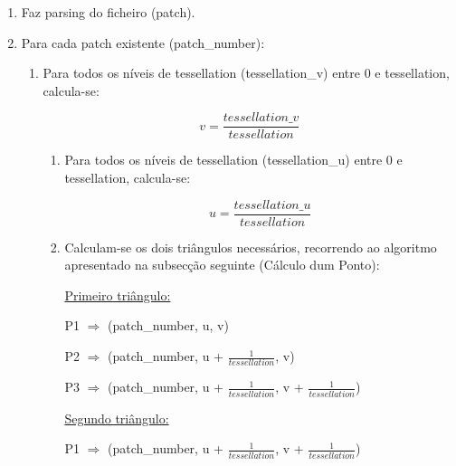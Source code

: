\documentclass[a4paper]{article}
\begin{document}
\ttfamily
\begin{enumerate}
  \item Faz parsing do ficheiro (patch).
  \item Para cada patch existente (patch\_number):
  \begin{enumerate}
  	\item Para todos os níveis de tessellation (tessellation\_v) entre 0 e tessellation, calcula-se:
	\vspace{0.5cm}

	\hspace{0.0cm} $$v = \frac{tessellation\_v}{tessellation}$$

	\vspace{0.5cm}

	\begin{enumerate}
		\item Para todos os níveis de tessellation (tessellation\_u) entre 0 e tessellation, calcula-se:
		\vspace{0.5cm}

		\hspace{0.0cm} $$u = \frac{tessellation\_u}{tessellation}$$

		\vspace{0.5cm}
		\item Calculam-se os dois triângulos necessários, recorrendo ao algoritmo apresentado na subsecção seguinte (Cálculo dum Ponto):
		\vspace{0.3cm}

      		\underline{Primeiro triângulo:}

     		\vspace{0.3cm}

          	P1 $\Rightarrow$ (patch\_number, u, v)

      		\vspace{0.2cm}

          	P2 $\Rightarrow$ (patch\_number, u + $\frac{1}{tessellation}$, v)

      		\vspace{0.2cm}

         	P3 $\Rightarrow$ (patch\_number, u + $\frac{1}{tessellation}$, v + $\frac{1}{tessellation}$)

      		\vspace{0.3cm}

		\underline{Segundo triângulo:}

      		\vspace{0.3cm}

          	P1 $\Rightarrow$ (patch\_number, u + $\frac{1}{tessellation}$, v + $\frac{1}{tessellation}$)


\end{enumerate}
\end{enumerate}
\end{enumerate}
\end{document}

